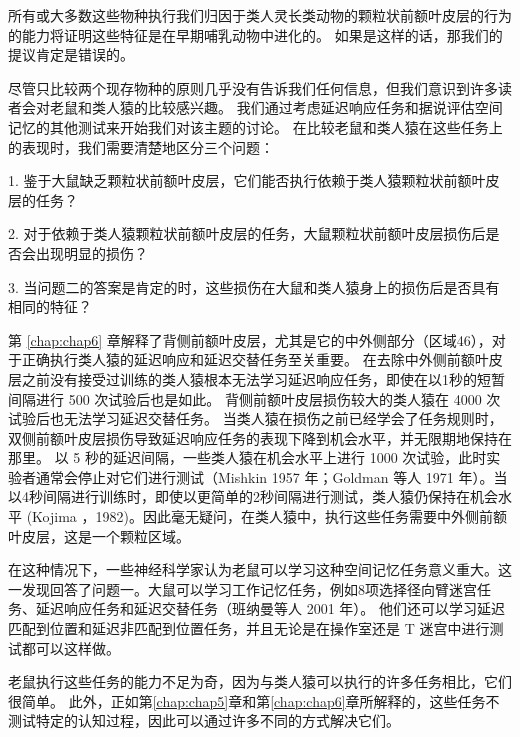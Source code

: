 所有或大多数这些物种执行我们归因于类人灵长类动物的颗粒状前额叶皮层的行为的能力将证明这些特征是在早期哺乳动物中进化的。
如果是这样的话，那我们的提议肯定是错误的。
\par


尽管只比较两个现存物种的原则几乎没有告诉我们任何信息，但我们意识到许多读者会对老鼠和类人猿的比较感兴趣。
我们通过考虑延迟响应任务和据说评估空间记忆的其他测试来开始我们对该主题的讨论。
在比较老鼠和类人猿在这些任务上的表现时，我们需要清楚地区分三个问题：
\par

1. 鉴于大鼠缺乏颗粒状前额叶皮层，它们能否执行依赖于类人猿颗粒状前额叶皮层的任务？ 
\par

2. 对于依赖于类人猿颗粒状前额叶皮层的任务，大鼠颗粒状前额叶皮层损伤后是否会出现明显的损伤？
\par

3. 当问题二的答案是肯定的时，这些损伤在大鼠和类人猿身上的损伤后是否具有相同的特征？
\par

第 \ref{chap:chap6} 章解释了背侧前额叶皮层，尤其是它的中外侧部分（区域46），对于正确执行类人猿的延迟响应和延迟交替任务至关重要。
在去除中外侧前额叶皮层之前没有接受过训练的类人猿根本无法学习延迟响应任务，即使在以1秒的短暂间隔进行 500 次试验后也是如此\cite{battig1960comparison}。
背侧前额叶皮层损伤较大的类人猿在 4000 次试验后也无法学习延迟交替任务\cite{goldman1978prenatal}。
当类人猿在损伤之前已经学会了任务规则时，双侧前额叶皮层损伤导致延迟响应任务的表现下降到机会水平，并无限期地保持在那里。 以 5 秒的延迟间隔，一些类人猿在机会水平上进行 1000 次试验，此时实验者通常会停止对它们进行测试（Mishkin 1957 年；Goldman 等人 1971 年）。当以4秒间隔进行训练时，即使以更简单的2秒间隔进行测试，类人猿仍保持在机会水平 (Kojima ，1982)。因此毫无疑问，在类人猿中，执行这些任务需要中外侧前额叶皮层，这是一个颗粒区域。
\par 
在这种情况下，一些神经科学家认为老鼠可以学习这种空间记忆任务意义重大。这一发现回答了问题一。大鼠可以学习工作记忆任务，例如8项选择径向臂迷宫任务\cite{olton1982disconnection,kesner1989retrospective}、延迟响应任务\cite{kolb1974double}和延迟交替任务\cite{thomas1980recovery}（班纳曼等人 2001 年）。
他们还可以学习延迟匹配到位置和延迟非匹配到位置任务，并且无论是在操作室\cite{sloan2006hippocampal}还是 T 迷宫\cite{dias2000effects}中进行测试都可以这样做。
\par


老鼠执行这些任务的能力不足为奇，因为与类人猿可以执行的许多任务相比，它们很简单。
此外，正如第\ref{chap:chap5}章和第\ref{chap:chap6}章所解释的，这些任务不测试特定的认知过程，因此可以通过许多不同的方式解决它们。
\par


